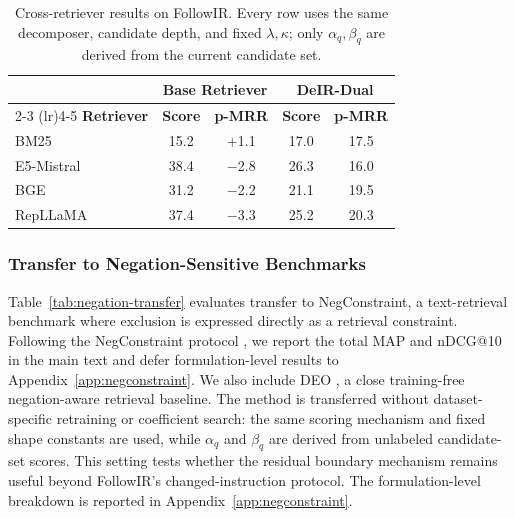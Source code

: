 \documentclass[letterpaper]{article}
\newcommand{\method}{DeIR-Dual}
\begin{document}
\begin{table}[!t]
\centering
\small
\begin{tabular}{lcccc}
\toprule
& \multicolumn{2}{c}{Base Retriever} &
\multicolumn{2}{c}{\method{}} \\
\cmidrule(lr){2-3} \cmidrule(lr){4-5}
\textbf{Retriever} & \textbf{Score} & \textbf{p-MRR}
& \textbf{Score} & \textbf{p-MRR} \\
\midrule
BM25 & 15.2 & $+$1.1 & 17.0 & 17.5 \\
E5-Mistral & 38.4 & $-$2.8 & 26.3 & 16.0 \\
BGE & 31.2 & $-$2.2 & 21.1 & 19.5 \\
RepLLaMA & 37.4 & $-$3.3 & 25.2 & 20.3 \\
\bottomrule
\end{tabular}
\caption{Cross-retriever results on FollowIR.  Every row uses the same
decomposer, candidate depth, and fixed $\lambda,\kappa$; only
$\alpha_q,\beta_q$ are derived from the current candidate set.}
\label{tab:cross-retriever}
\end{table}

\subsubsection{Transfer to Negation-Sensitive Benchmarks}
\label{sec:negation-benchmarks}

Table~\ref{tab:negation-transfer} evaluates transfer to NegConstraint,
a text-retrieval benchmark where exclusion is expressed directly as a
retrieval constraint.  Following the NegConstraint protocol
\cite{xu2025logical}, we report the total MAP and nDCG@10 in the main
text and defer formulation-level results to Appendix~\ref{app:negconstraint}.
We also include DEO \cite{deo2026}, a close training-free
negation-aware retrieval baseline.  The method is transferred without
dataset-specific retraining or coefficient search: the same scoring
mechanism and fixed shape constants are used, while $\alpha_q$ and
$\beta_q$ are derived from unlabeled candidate-set scores.  This setting
tests whether the residual boundary mechanism remains useful beyond
FollowIR's changed-instruction protocol.  The formulation-level breakdown
is reported in Appendix~\ref{app:negconstraint}.
\end{document}
